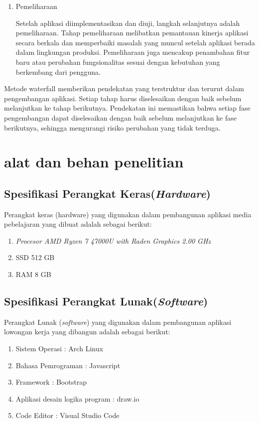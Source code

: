 \begin{enumerate}[leftmargin=1cm, itemindent=0.6cm,labelwidth=15pt, labelsep=5pt, listparindent=1cm,align=left]
\item Pemeliharaan

    Setelah aplikasi diimplementasikan dan diuji, langkah selanjutnya adalah pemeliharaan. Tahap pemeliharaan melibatkan pemantauan kinerja aplikasi secara berkala dan memperbaiki masalah yang muncul setelah aplikasi berada dalam lingkungan produksi. Pemeliharaan juga mencakup penambahan fitur baru atau perubahan fungsionalitas sesuai dengan kebutuhan yang berkembang dari pengguna.

\end{enumerate}

Metode waterfall memberikan pendekatan yang terstruktur dan terurut dalam pengembangan aplikasi. Setiap tahap harus diselesaikan dengan baik sebelum melanjutkan ke tahap berikutnya. Pendekatan ini memastikan bahwa setiap fase pengembangan dapat diselesaikan dengan baik sebelum melanjutkan ke fase berikutnya, sehingga mengurangi risiko perubahan yang tidak terduga.

\section{alat dan behan penelitian}
\subsection{Spesifikasi Perangkat Keras(\textit{Hardware})}
    Perangkat keras (hardware) yang digunakan dalam pembangunan aplikasi media pebelajaran yang dibuat adalah sebagai berikut:
\begin{enumerate}
    \item \textit{Procesor AMD Ryzen 7 47000U with Raden Graphics 2.00 GHz}
    \item SSD 512 GB
    \item RAM 8 GB
\end{enumerate}

\subsection{Spesifikasi Perangkat Lunak(\textit{Software})}
    Perangkat Lunak (\textit{software}) yang digunakan dalam pembangunan aplikasi lowongan kerja yang dibangun adalah sebagai berikut:

\begin{enumerate}
    \item Sistem Operasi : Arch Linux
    \item Bahasa Pemrograman : Javascript
    \item Framework : Bootstrap
    \item Aplikasi desain logika program : draw.io
    \item Code Editor : Visual Studio Code
\end{enumerate}

